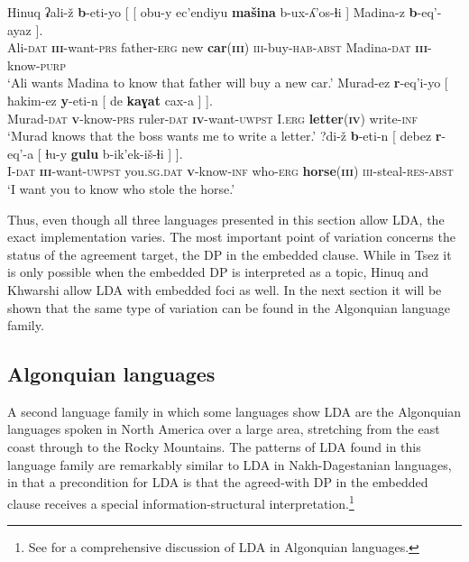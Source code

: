 \documentclass[output=paper
,modfonts
,nonflat]{langsci/langscibook}
\begin{document}
\begin{exe}
\ex Hinuq \citep[][633]{Forker2012} \label{ex:hinuq_cross-clausal}
	\xlist
	\ex \label{ex:hinuq_non-loc}
		\gll ʡali-\v{z} \textbf{b}-eti-yo [ [ obu-y ec'endiyu \textbf{ma\v{s}ina} b-ux-ʎ'os-ɬi ] Madina-z \textbf{b}-eq'-ayaz ].\\
			 Ali-\textsc{dat} \textbf{\textsc{iii}}-want-\textsc{prs} {} {} father-\textsc{erg} new \textbf{car}(\textbf{\textsc{iii}}) \textsc{iii}-buy-\textsc{hab}-\textsc{abst} {} Madina-\textsc{dat} \textbf{\textsc{iii}}-know-\textsc{purp}\\
		\glt `Ali wants Madina to know that father will buy a new car.'
	\ex \label{ex:hinuq_med}
		\gll Murad-ez \textbf{r}-eq'i-yo [ ħakim-ez \textbf{y}-eti-n [ de \textbf{kaɣat} cax-a ] ].\\
			 Murad-\textsc{dat} \textbf{\textsc{v}}-know-\textsc{prs} {} ruler-\textsc{dat} \textbf{\textsc{iv}}-want-\textsc{uwpst} {} I.\textsc{erg} \textbf{letter}(\textbf{\textsc{iv}}) write-\textsc{inf}\\
		\glt `Murad knows that the boss wants me to write a letter.'
	\ex \label{ex:hinuq_high}
		\gll ?di-\v{z} \textbf{b}-eti-n [ debez \textbf{r}-eq'-a [ ɬu-y \textbf{gulu} b-ik'ek-i\v{s}-ɬi ] ].\\
			 I-\textsc{dat} \textbf{\textsc{iii}}-want-\textsc{uwpst} {} you.\textsc{sg.dat} \textbf{\textsc{v}}-know-\textsc{inf} {} who-\textsc{erg} \textbf{horse}(\textbf{\textsc{iii}}) \textsc{iii}-steal-\textsc{res}-\textsc{abst}\\
		\glt `I want you to know who stole the horse.'
	\endxlist
\end{exe}
Thus, even though all three languages presented in this section allow LDA, the exact implementation varies. The most important point of variation concerns the status of the agreement target, the DP in the embedded clause. While in Tsez it is only possible when the embedded DP is interpreted as a topic, Hinuq and Khwarshi allow LDA with embedded foci as well. In the next section it will be shown that the same type of variation can be found in the Algonquian language family.

\subsection{Algonquian languages}

A second language family in which some languages show LDA are the Algonquian languages spoken in North America over a large area, stretching from the east coast through to the Rocky Mountains. The patterns of LDA found in this language family are remarkably similar to LDA in Nakh-Dagestanian languages, in that a precondition for LDA is that the agreed-with DP in the embedded clause receives a special information-structural interpretation.\footnote{See \citet{Fry_Hamilton2014} for a comprehensive discussion of LDA in Algonquian languages.}\largerpage
\end{document}
